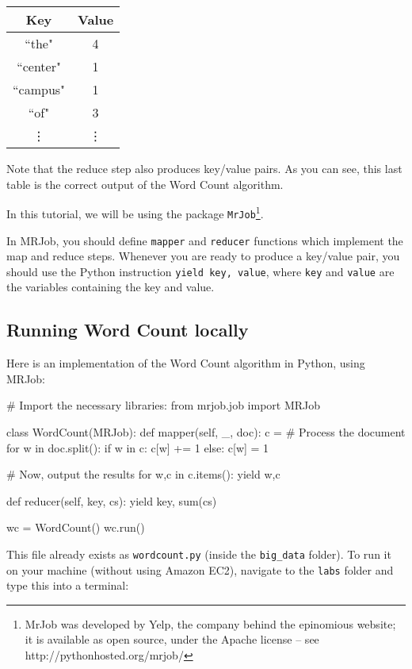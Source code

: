 \begin{center}
\begin{tabular}{|c|c|}
\hline
Key & Value \\
\hline\hline
``the" & 4 \\
``center" & 1 \\
``campus" & 1 \\
``of" & 3\\
\vdots & \vdots \\
\end{tabular}
\end{center}

Note that the reduce step also produces key/value pairs. As you can see, this last table is the correct output of the Word Count algorithm.

In this tutorial, we will be using the package \texttt{MrJob}\footnote{MrJob was developed by Yelp, the company behind the epinomious website; it is available
as open source, under the Apache license -- see http://pythonhosted.org/mrjob/}.

In MRJob, you should define \texttt{mapper} and \texttt{reducer} functions which implement the map and reduce steps. Whenever you are ready to produce a key/value pair, you should use the Python instruction \texttt{yield key, value}, where \texttt{key} and \texttt{value} are the variables containing the key and value.

\subsection{Running Word Count locally}

Here is an implementation of the Word Count algorithm in Python, using MRJob:

\begin{python}
# Import the necessary libraries:
from mrjob.job import MRJob

class WordCount(MRJob):
    def mapper(self, _, doc):
        c = {}
        # Process the document
        for w in doc.split():
            if w in c:
                c[w] += 1
            else:
                c[w] = 1

        # Now, output the results
        for w,c in c.items():
            yield w,c

    def reducer(self, key, cs):
        yield key, sum(cs)

wc = WordCount()
wc.run()
\end{python}

This file already exists as \texttt{wordcount.py} (inside the \texttt{big\_data} folder). To run it on your machine (without using Amazon EC2), navigate to the \texttt{labs} folder and type this into a terminal:

